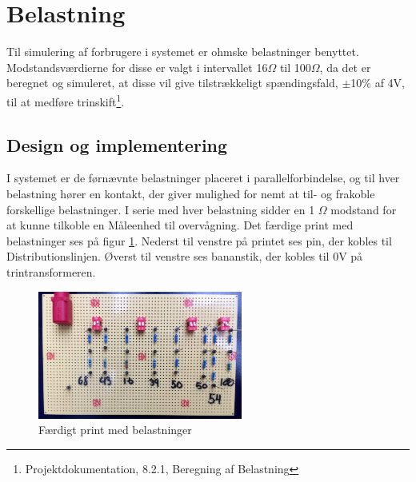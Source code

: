 
\section{Belastning}

Til simulering af forbrugere i systemet er ohmske belastninger benyttet. Modstandsværdierne for disse er valgt i intervallet 16$\Omega$ til 100$\Omega$, da det er beregnet og simuleret, at disse vil give tilstrækkeligt spændingsfald, $\pm$10$\%$ af 4V, til at medføre trinskift\footnote{Projektdokumentation, 8.2.1, Beregning af Belastning}. 

\subsection{Design og implementering}

I systemet er de førnævnte belastninger placeret i parallelforbindelse, og til hver belastning hører en kontakt, der giver mulighed for nemt at til- og frakoble forskellige belastninger. I serie med hver belastning sidder en 1 $\Omega$ modstand for at kunne tilkoble en Måleenhed til overvågning. Det færdige print med belastninger ses på figur \ref{fig:Belastning}. Nederst til venstre på printet ses pin, der kobles til Distributionslinjen. Øverst til venstre ses bananstik, der kobles til 0V på trintransformeren. 

\begin{figure}[H]
	\centering
	\includegraphics[width=0.6\textwidth]{figure/Belastningskreds}
	\caption{Færdigt print med belastninger}
	\label{fig:Belastning}
\end{figure}